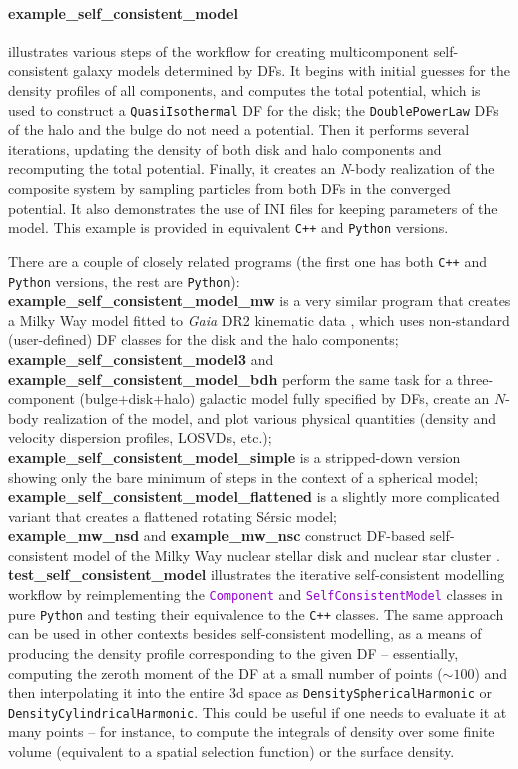 \documentclass[12pt]{article}
\newcommand{\Nbody}{\textsl{N}-body\xspace}
\newcommand{\Cpp}  {\texttt{C++}\xspace}
\newcommand{\Python}{\texttt{Python}\xspace}
\newcommand{\ttt}[1]{\textcolor{darkviolet}{\texttt{#1}}}
\newcommand{\ppp}[1]{\textcolor{darkolive} {\texttt{#1}}}
\let\oldparagraph\paragraph
\renewcommand{\paragraph}[1]{\vspace{-2mm}\oldparagraph{#1}}
\begin{document}
\paragraph{example_self_consistent_model} \label{sec:ExampleSCM} illustrates various steps of the workflow for creating multicomponent self-consistent galaxy models determined by DFs. It begins with initial guesses for the density profiles of all components, and computes the total potential, which is used to construct a \ppp{QuasiIsothermal} DF for the disk; the \ppp{DoublePowerLaw} DFs of the halo and the bulge do not need a potential. Then it performs several iterations, updating the density of both disk and halo components and recomputing the total potential. Finally, it creates an \Nbody realization of the composite system by sampling particles from both DFs in the converged potential. It also demonstrates the use of INI files for keeping parameters of the model. This example is provided in equivalent \Cpp and \Python versions.

There are a couple of closely related programs (the first one has both \Cpp and \Python versions, the rest are \Python):\\
\textbf{example_self_consistent_model_mw} is a very similar program that creates a Milky Way model fitted to \textit{Gaia} DR2 kinematic data \cite{BinneyVasiliev2023}, which uses non-standard (user-defined) DF classes for the disk and the halo components;\\
\textbf{example_self_consistent_model3} and \textbf{example_self_consistent_model_bdh} perform the same task for a three-component (bulge+disk+halo) galactic model fully specified by DFs, create an $N$-body realization of the model, and plot various physical quantities (density and velocity dispersion profiles, LOSVDs, etc.);\\
\textbf{example_self_consistent_model_simple} is a stripped-down version showing only the bare minimum of steps in the context of a spherical model;\\
\textbf{example_self_consistent_model_flattened} is a slightly more complicated variant that creates a flattened rotating S\'ersic model;\\
\textbf{example_mw_nsd} and \textbf{example_mw_nsc} construct DF-based self-consistent model of the Milky Way nuclear stellar disk \cite{Sormani2022a} and nuclear star cluster \cite{Vasiliev2026}.\\
\textbf{test_self_consistent_model} illustrates the iterative self-consistent modelling workflow by reimplementing the \ttt{Component} and \ttt{SelfConsistentModel} classes in pure \Python and testing their equivalence to the \Cpp classes. The same approach can be used in other contexts besides self-consistent modelling, as a means of producing the density profile corresponding to the given DF -- essentially, computing the zeroth moment of the DF at a small number of points ($\sim 100$) and then interpolating it into the entire 3d space as \ppp{DensitySphericalHarmonic} or \ppp{DensityCylindricalHarmonic}. This could be useful if one needs to evaluate it at many points -- for instance, to compute the integrals of density over some finite volume (equivalent to a spatial selection function) or the surface density.
\end{document}
